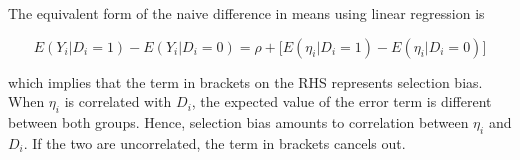 \documentclass[12pt]{article}
\begin{document}
The equivalent form of the naive difference in means using linear regression is

\begin{equation*}
    E(Y_i | D_i = 1) - E(Y_i | D_i = 0) = \rho + \big[
        E(\eta_i | D_i = 1) - E(\eta_i | D_i = 0) \big]
\end{equation*}

which implies that the term in brackets on the RHS represents selection bias.
When $\eta_i$ is correlated with $D_i$, the expected value of the error term is
different between both groups. Hence, selection bias amounts to correlation
between $\eta_i$ and $D_i$. If the two are uncorrelated, the term in brackets
cancels out.

\end{document}

